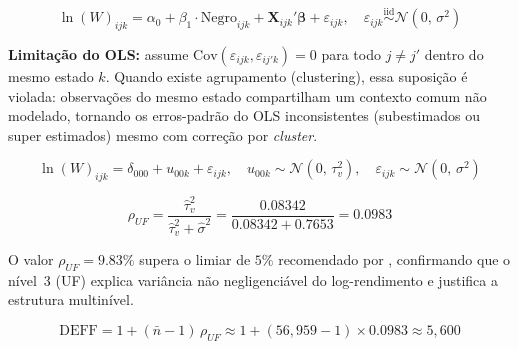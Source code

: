
\begin{equation}
  \ln(W)_{ijk} = \alpha_0
    + \beta_1 \cdot \text{Negro}_{ijk}
    + \mathbf{X}_{ijk}'\boldsymbol{\beta}
    + \varepsilon_{ijk}, \quad
  \varepsilon_{ijk} \overset{\text{iid}}{\sim} \mathcal{N}\!\left(0,\,\sigma^2\right)
  \label{eq:ols}
\end{equation}

\noindent
\textbf{Limitação do OLS:} assume $\mathrm{Cov}(\varepsilon_{ijk},\varepsilon_{ij'k})=0$ para
todo $j \neq j'$ dentro do mesmo estado $k$. Quando existe agrupamento (clustering), essa
suposição é violada: observações do mesmo estado compartilham um contexto comum não modelado,
tornando os erros-padrão do OLS inconsistentes (subestimados ou super estimados) mesmo com
correção por \textit{cluster}.

\begin{equation}
  \ln(W)_{ijk} = \delta_{000} + u_{00k} + \varepsilon_{ijk}, \quad
  u_{00k} \sim \mathcal{N}\!\left(0,\,\tau^2_v\right), \quad
  \varepsilon_{ijk} \sim \mathcal{N}\!\left(0,\,\sigma^2\right)
  \label{eq:m0}
\end{equation}

\begin{equation}
  \rho_{UF} = \frac{\hat{\tau}^2_v}{\hat{\tau}^2_v + \hat{\sigma}^2}
  = \frac{0.08342}{0.08342 + 0.7653}
  = 0.0983
  \label{eq:icc_valor}
\end{equation}

\noindent
O valor $\rho_{UF} = 9.83\%$ supera o limiar de $5\%$ recomendado por
\citet{raudenbush2002}, confirmando que o nível~3 (UF) explica variância não negligenciável
do log-rendimento e justifica a estrutura multinível.

\begin{equation}
  \text{DEFF} = 1 + \left(\bar{n} - 1\right)\,\rho_{UF}
  \approx 1 + \left(56,959 - 1\right) \times 0.0983
  \approx 5,600
  \label{eq:deff}
\end{equation}

